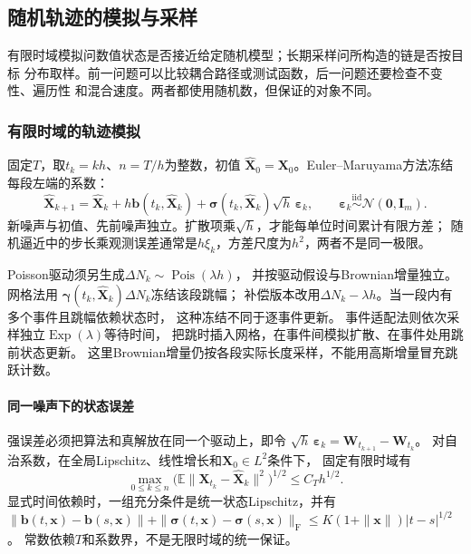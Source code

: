 \subsection{随机轨迹的模拟与采样}

有限时域模拟问数值状态是否接近给定随机模型；长期采样问所构造的链是否按目标
分布取样。前一问题可以比较耦合路径或测试函数，后一问题还要检查不变性、遍历性
和混合速度。两者都使用随机数，但保证的对象不同。

\subsubsection{有限时域的轨迹模拟}

固定$T$，取$t_k=kh$、$n=T/h$为整数，初值
$\widehat{\bm X}_0=\bm X_0$。Euler--Maruyama方法冻结每段左端的系数：
\begin{equation}
 \widehat{\bm X}_{k+1}=\widehat{\bm X}_k+
    h\bm b(t_k,\widehat{\bm X}_k)
    +\bm\sigma(t_k,\widehat{\bm X}_k)\sqrt h\,\bm\varepsilon_k,
 \qquad \bm\varepsilon_k\overset{\mathrm{iid}}{\sim}\mathcal N(\bm0,\bm I_m).
 \label{eq:dynamical-euler-maruyama}
\end{equation}
新噪声与初值、先前噪声独立。扩散项乘$\sqrt h$，才能每单位时间累计有限方差；
随机逼近中的步长乘观测误差通常是$h\xi_k$，方差尺度为$h^2$，两者不是同一极限。

Poisson驱动须另生成$\Delta N_k\sim\operatorname{Pois}(\lambda h)$，
并按驱动假设与Brownian增量独立。网格法用
$\bm\gamma(t_k,\widehat{\bm X}_k)\Delta N_k$冻结该段跳幅；
补偿版本改用$\Delta N_k-\lambda h$。当一段内有多个事件且跳幅依赖状态时，
这种冻结不同于逐事件更新。
事件适配法则依次采样独立$\operatorname{Exp}(\lambda)$等待时间，
把跳时插入网格，在事件间模拟扩散、在事件处用跳前状态更新。
这里Brownian增量仍按各段实际长度采样，不能用高斯增量冒充跳跃计数。

\paragraph{同一噪声下的状态误差}

强误差必须把算法和真解放在同一个驱动上，即令
$\sqrt h\,\bm\varepsilon_k=\bm W_{t_{k+1}}-\bm W_{t_k}$。
对自治系数，在全局Lipschitz、线性增长和$\bm X_0\in L^2$条件下，
固定有限时域有
\[
 \max_{0\leq k\leq n}
   \bigl(\mathbb E\|\bm X_{t_k}-\widehat{\bm X}_k\|^2\bigr)^{1/2}
     \leq C_T h^{1/2}.
\]
显式时间依赖时，一组充分条件是统一状态Lipschitz，并有
$\|\bm b(t,\bm x)-\bm b(s,\bm x)\|
 +\|\bm\sigma(t,\bm x)-\bm\sigma(s,\bm x)\|_{\mathrm F}
 \leq K(1+\|\bm x\|)|t-s|^{1/2}$。
常数依赖$T$和系数界，不是无限时域的统一保证。

